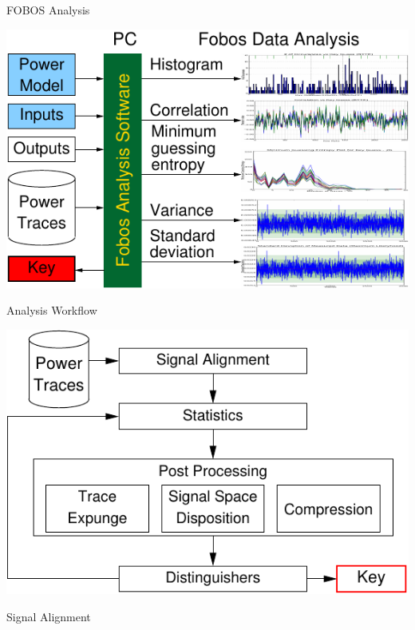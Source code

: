 \documentclass[final]{beamer}
\begin{document}
\begin{frame}[fragile]{}
\begin{columns}[t]
\begin{column}{.31\linewidth}
       \begin{block}{FOBOS Analysis}
        \begin{center}
          \includegraphics[scale=1.5]{../figures/fobos-dan}
        \end{center} 
       \end{block}
       \begin{block}{Analysis Workflow}
        \begin{center}
          \includegraphics[scale=1.5]{../figures/data_anl}
        \end{center} 
       \end{block}
       \begin{block}{Signal Alignment}
        \begin{minipage}[t]{0.49\linewidth}

\end{minipage}
\end{block}
\end{column}
\end{columns}
\end{frame}
\end{document}
